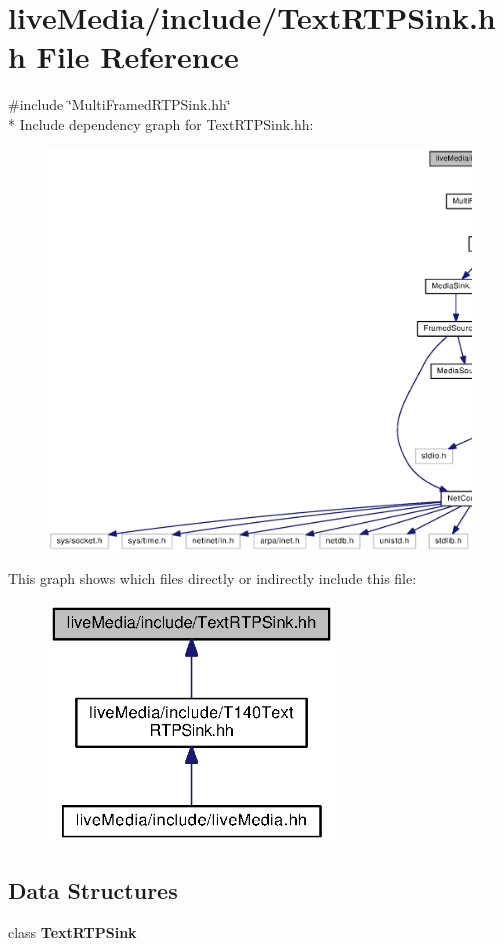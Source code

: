 \section{live\+Media/include/\+Text\+R\+T\+P\+Sink.hh File Reference}
\label{TextRTPSink_8hh}
{\ttfamily \#include \char`\"{}Multi\+Framed\+R\+T\+P\+Sink.\+hh\char`\"{}}\\*
Include dependency graph for Text\+R\+T\+P\+Sink.\+hh\+:
\nopagebreak
\begin{figure}[H]
\begin{center}
\leavevmode
\includegraphics[width=350pt]{TextRTPSink_8hh__incl}
\end{center}
\end{figure}
This graph shows which files directly or indirectly include this file\+:
\nopagebreak
\begin{figure}[H]
\begin{center}
\leavevmode
\includegraphics[width=215pt]{TextRTPSink_8hh__dep__incl}
\end{center}
\end{figure}
\subsection*{Data Structures}
\begin{DoxyCompactItemize}
\item 
class {\bf Text\+R\+T\+P\+Sink}
\end{DoxyCompactItemize}
